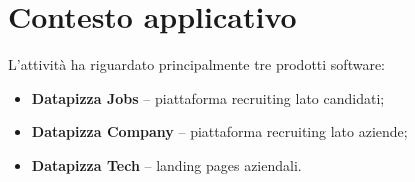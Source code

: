 \chapter{Contesto applicativo}
L'attività ha riguardato principalmente tre prodotti software:
\begin{itemize}
  \item \textbf{Datapizza Jobs} – piattaforma recruiting lato candidati;
  \item \textbf{Datapizza Company} – piattaforma recruiting lato aziende;
  \item \textbf{Datapizza Tech} – landing pages aziendali.
\end{itemize}